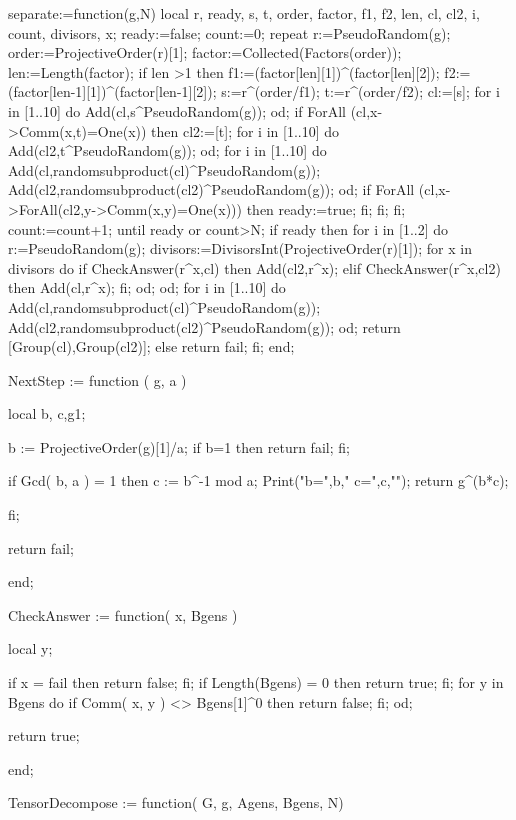 separate:=function(g,N)
local r, ready, s, t, order, factor, f1, f2, len, cl, cl2, i, count, divisors, x;
ready:=false;
count:=0;
repeat 
   r:=PseudoRandom(g);
   order:=ProjectiveOrder(r)[1];
   factor:=Collected(Factors(order));
   len:=Length(factor);
   if len >1 then 
      f1:=(factor[len][1])^(factor[len][2]);
      f2:=(factor[len-1][1])^(factor[len-1][2]);
      s:=r^(order/f1);
      t:=r^(order/f2);
      cl:=[s];
      for i in [1..10] do 
        Add(cl,s^PseudoRandom(g));
      od;
      if ForAll (cl,x->Comm(x,t)=One(x)) then 
         cl2:=[t];
         for i in [1..10] do 
            Add(cl2,t^PseudoRandom(g));
         od;
         for i in [1..10] do
           Add(cl,randomsubproduct(cl)^PseudoRandom(g));
           Add(cl2,randomsubproduct(cl2)^PseudoRandom(g));
         od;
         if ForAll (cl,x->ForAll(cl2,y->Comm(x,y)=One(x))) then
            ready:=true;
         fi;
       fi;
   fi;
   count:=count+1;
until ready or count>N;
if ready then 
   for i in [1..2] do
       r:=PseudoRandom(g);
       divisors:=DivisorsInt(ProjectiveOrder(r)[1]);
       for x in divisors do 
           if CheckAnswer(r^x,cl) then 
              Add(cl2,r^x);
           elif CheckAnswer(r^x,cl2) then
              Add(cl,r^x);
           fi;
       od;
   od;
   for i in [1..10] do
       Add(cl,randomsubproduct(cl)^PseudoRandom(g));
       Add(cl2,randomsubproduct(cl2)^PseudoRandom(g));
   od;
   return [Group(cl),Group(cl2)];
else 
   return fail;
fi;
end;


NextStep := function ( g, a )

	 local b, c,g1;

	 b := ProjectiveOrder(g)[1]/a;
         if b=1 then return fail; fi;

	 if Gcd( b, a ) = 1 then
	    c := b^-1 mod a;
Print("b=",b,"  c=",c,"\n");
            return g^(b*c);
	 		
         fi;

	 return fail;

end;


CheckAnswer := function( x, Bgens )

	    local y;

	    if x = fail then return false; fi;	    
	    if Length(Bgens) = 0 then return true; fi;
	    for y in Bgens do
	    	if Comm( x, y ) <> Bgens[1]^0 then
		   return false;
                fi;
	    od;

	    return true;

end;


TensorDecompose := function( G, g, Agens, Bgens, N)


